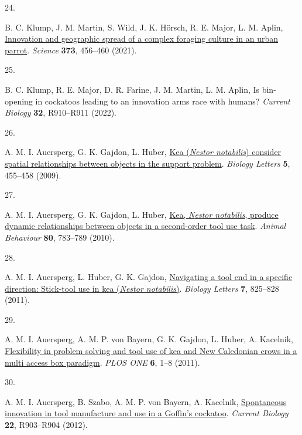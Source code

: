 \documentclass[
  man,floatsintext]{apa6}
\newlength{\cslhangindent}
\newlength{\csllabelwidth}
\newlength{\cslentryspacingunit} %
\newenvironment{CSLReferences}[2] %
 {%
  \setlength{\parindent}{0pt}
  \ifodd #1
  \let\oldpar\par
  \def\par{\hangindent=\cslhangindent\oldpar}
  \fi
  \setlength{\parskip}{#2\cslentryspacingunit}
 }%
 {}
\newcommand{\CSLLeftMargin}[1]{\parbox[t]{\csllabelwidth}{#1}}
\newcommand{\CSLRightInline}[1]{\parbox[t]{\linewidth - \csllabelwidth}{#1}\break}
\begin{document}
\begin{CSLReferences}{0}{0}
\leavevmode{}%
\CSLLeftMargin{24. }%
\CSLRightInline{B. C. Klump, J. M. Martin, S. Wild, J. K. Hörsch, R. E. Major, L. M. Aplin, \href{https://doi.org/10.1126/science.abe7808}{Innovation and geographic spread of a complex foraging culture in an urban parrot}. \emph{Science} \textbf{373}, 456--460 (2021).}

\leavevmode{}%
\CSLLeftMargin{25. }%
\CSLRightInline{B. C. Klump, R. E. Major, D. R. Farine, J. M. Martin, L. M. Aplin, Is bin-opening in cockatoos leading to an innovation arms race with humans? \emph{Current Biology} \textbf{32}, R910--R911 (2022).}

\leavevmode{}%
\CSLLeftMargin{26. }%
\CSLRightInline{A. M. I. Auersperg, G. K. Gajdon, L. Huber, \href{https://doi.org/10.1098/rsbl.2009.0114}{Kea (\emph{{N}estor notabilis}) consider spatial relationships between objects in the support problem}. \emph{Biology Letters} \textbf{5}, 455--458 (2009).}

\leavevmode{}%
\CSLLeftMargin{27. }%
\CSLRightInline{A. M. I. Auersperg, G. K. Gajdon, L. Huber, \href{https://doi.org/10.1016/j.anbehav.2010.08.007}{Kea, \emph{{N}estor notabilis}, produce dynamic relationships between objects in a second-order tool use task}. \emph{Animal Behaviour} \textbf{80}, 783--789 (2010).}

\leavevmode{}%
\CSLLeftMargin{28. }%
\CSLRightInline{A. M. I. Auersperg, L. Huber, G. K. Gajdon, \href{https://doi.org/10.1098/rsbl.2011.0388}{Navigating a tool end in a specific direction: Stick-tool use in kea (\emph{{N}estor notabilis})}. \emph{Biology Letters} \textbf{7}, 825--828 (2011).}

\leavevmode{}%
\CSLLeftMargin{29. }%
\CSLRightInline{A. M. I. Auersperg, A. M. P. von Bayern, G. K. Gajdon, L. Huber, A. Kacelnik, \href{https://doi.org/10.1371/journal.pone.0020231}{Flexibility in problem solving and tool use of kea and {N}ew {C}aledonian crows in a multi access box paradigm}. \emph{PLOS ONE} \textbf{6}, 1--8 (2011).}

\leavevmode{}%
\CSLLeftMargin{30. }%
\CSLRightInline{A. M. I. Auersperg, B. Szabo, A. M. P. von Bayern, A. Kacelnik, \href{https://doi.org/10.1016/j.cub.2012.09.002}{Spontaneous innovation in tool manufacture and use in a {G}offin's cockatoo}. \emph{Current Biology} \textbf{22}, R903--R904 (2012).}


\end{CSLReferences}
\end{document}
